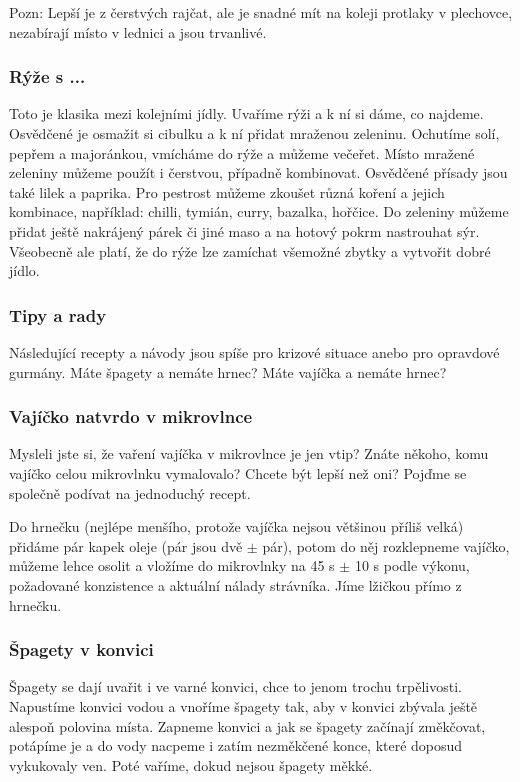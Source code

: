 Pozn: Lepší je z čerstvých rajčat, ale je snadné mít na koleji protlaky v plechovce, nezabírají místo v lednici a jsou trvanlivé.

\subsubsection*{Rýže s ...}
Toto je klasika mezi kolejními jídly. Uvaříme rýži a k ní si dáme, co najdeme. Osvědčené je osmažit si cibulku a k ní přidat mraženou zeleninu. Ochutíme solí, pepřem a majoránkou, vmícháme do rýže a můžeme večeřet. Místo mražené zeleniny můžeme použít i čerstvou, případně kombinovat. Osvědčené přísady jsou také lilek a paprika. Pro pestrost můžeme zkoušet různá koření a jejich kombinace, například: chilli, tymián, curry, bazalka, hořčice. Do zeleniny můžeme přidat ještě nakrájený párek či jiné maso a na hotový pokrm nastrouhat sýr. Všeobecně ale platí, že do rýže lze zamíchat všemožné zbytky a vytvořit dobré jídlo.

\subsubsection*{Tipy a rady}
Následující recepty a návody jsou spíše pro krizové situace anebo pro opravdové gurmány. Máte špagety a nemáte hrnec? Máte vajíčka a nemáte hrnec?

\subsubsection*{Vajíčko natvrdo v mikrovlnce}
Mysleli jste si, že vaření vajíčka v mikrovlnce je jen vtip? Znáte někoho, komu vajíčko celou mikrovlnku vymalovalo? Chcete být lepší než oni? Pojďme se společně podívat na jednoduchý recept.

Do hrnečku (nejlépe menšího, protože vajíčka nejsou většinou příliš velká) přidáme pár kapek oleje (pár jsou dvě $\pm$ pár), potom do něj rozklepneme vajíčko, můžeme lehce osolit a vložíme do mikrovlnky na 45 s $\pm$ 10 s podle výkonu, požadované konzistence a aktuální nálady strávníka. Jíme lžičkou přímo z hrnečku.

\subsubsection*{Špagety v konvici}
Špagety se dají uvařit i ve varné konvici, chce to jenom trochu trpělivosti. Napustíme konvici vodou a vnoříme špagety tak, aby v konvici zbývala ještě alespoň polovina místa. Zapneme konvici a jak se špagety začínají změkčovat, potápíme je a do vody nacpeme i zatím nezměkčené konce, které doposud vykukovaly ven. Poté vaříme, dokud nejsou špagety měkké.

